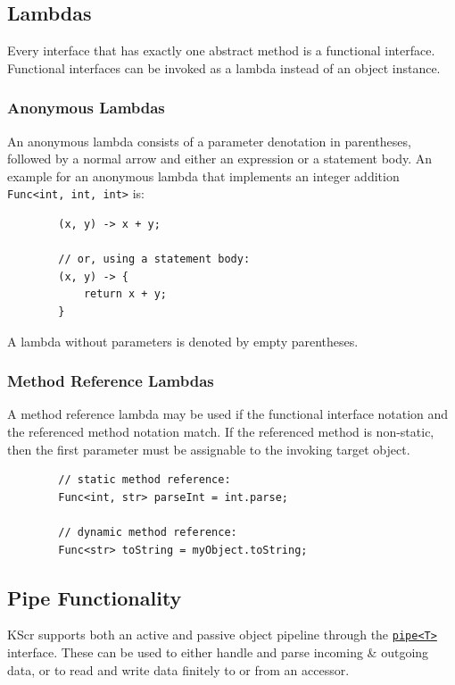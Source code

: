 \documentclass{docs}
\begin{document}
    \subsection{Lambdas}
    Every interface that has exactly one abstract method is a functional interface. \\
    Functional interfaces can be invoked as a lambda instead of an object instance.

    \subsubsection{Anonymous Lambdas}
    An anonymous lambda consists of a parameter denotation in parentheses, followed by a normal arrow and either an expression or a statement body.
    An example for an anonymous lambda that implements an integer addition \texttt{Func<int, int, int>} is: \\
    \begin{verbatim}
        (x, y) -> x + y;

        // or, using a statement body:
        (x, y) -> {
            return x + y;
        }
    \end{verbatim}
    A lambda without parameters is denoted by empty parentheses.

    \subsubsection{Method Reference Lambdas}
    A method reference lambda may be used if the functional interface notation and the referenced method notation match.
    If the referenced method is non-static, then the first parameter must be assignable to the invoking target object.
    \begin{verbatim}
        // static method reference:
        Func<int, str> parseInt = int.parse;

        // dynamic method reference:
        Func<str> toString = myObject.toString;
    \end{verbatim}

    \subsection{Pipe Functionality}
    KScr supports both an active and passive object pipeline through the \hyperref[typePipe]{\texttt{pipe<T>}} interface.
    These can be used to either handle and parse incoming \& outgoing data, or to read and write data finitely to or from an accessor.
\end{document}
